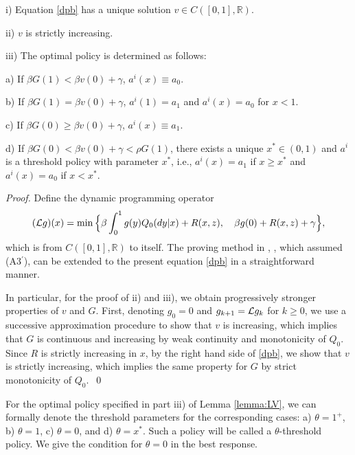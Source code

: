 \documentclass[graybox]{svmult}
\begin{document}
\begin{lemma} \label{lemma:LV}
i) Equation \eqref{dpb} has a unique solution $v\in C([0,1], \mathbb{R})$.

ii) $v$ is strictly increasing.

iii) The optimal policy is determined as follows:

\quad a) If $\beta G(1)< \beta v(0)+\gamma$, $a^i(x)\equiv a_0$.

\quad b) If $\beta G(1)= \beta v(0)+\gamma$, $a^i(1)= a_1$ and $a^i(x)= a_0$ for $x<1$.

\quad c) If $\beta G(0)\ge \beta v(0)+\gamma$,    $a^i(x) \equiv a_1$.

\quad d) If $\beta G(0)< \beta v(0)+\gamma <\rho G(1)$, there exists a unique $x^*\in (0, 1)$ and $a^i$ is a threshold policy with parameter $x^*$, i.e., $a^i(x)=a_1$ if $x\ge x^*$ and $a^i(x)=a_0$ if $x<x^*$.
\end{lemma}

\begin{proof}
Define the dynamic programming operator
\begin{align}
({\cal L} g)(x)=\min \Big\{
\beta\int_0^1 g (y)Q_0(dy|x) +R(x,z), \quad \beta g(0) +R(x, z)+\gamma
\Big\},\label{dpo}
\end{align}
which is from $ C([0,1], \mathbb{R})$ to itself.
 The proving method in \cite{HM16Chen}, \cite[Lemma 6]{HM17},   which assumed (A3$^\prime$), can be
extended to the present equation \eqref{dpb}
in a straightforward manner.

 In particular, for the proof of ii) and iii), we  obtain progressively  stronger properties of $v$ and $G$.
First, denoting $g_0=0$ and $g_{k+1}={\cal L} g_k$ for $k\ge 0$,
  we  use a successive approximation procedure to show that
$v$ is increasing, which implies that $G$ is continuous and increasing by weak continuity and  monotonicity of $Q_0$. Since $R$ is strictly increasing in $x$, by the right hand side of \eqref{dpb}, we show that $v$ is strictly increasing, which implies the same property for $G$ by strict monotonicity of $Q_0$.~\qed
\end{proof}

For the optimal policy specified in part iii) of Lemma \ref{lemma:LV}, we can
formally denote the threshold parameters for the corresponding cases: a) $\theta=1^+$, b) $\theta=1$, c) $\theta=0$, and d) $\theta=x^*$.
Such a policy will be called a $\theta$-threshold policy.
We give the condition for $\theta=0$ in the best response.
\end{document}
